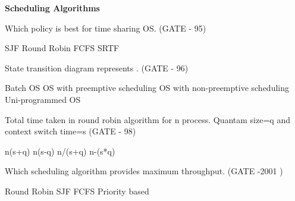 
\centerline{\textbf{ \LARGE Scheduling Algorithms}}


\setcounter{question}{0}


\begin{minipage}{\linewidth}

\question Which policy is best for time sharing OS. (GATE - 95)

\begin{oneparchoices}
   \choice SJF
   \choice Round Robin
   \choice FCFS
   \choice SRTF
\end{oneparchoices}

\end{minipage}


\begin{minipage}{\linewidth}


\question State transition diagram represents . (GATE - 96)
\begin{choices}
   \choice Batch OS
   \choice OS with preemptive scheduling
   \choice OS with non-preemptive scheduling
   \choice Uni-programmed OS
\end{choices}


\end{minipage}



\begin{minipage}{\linewidth}

\question Total time taken in round robin algorithm for n process. Quantam size=q and context switch time=s  (GATE - 98)


\begin{oneparchoices}
   \choice n(s+q)
   \choice n(s-q)
   \choice n/(s+q)
   \choice n-(s*q)
\end{oneparchoices}


\end{minipage}


\begin{minipage}{\linewidth}

  \question Which scheduling algorithm provides maximum throughput. (GATE -2001 )

  \begin{oneparchoices}
    \choice Round Robin
    \choice SJF
    \choice FCFS
    \choice Priority based
  \end{oneparchoices}

\end{minipage}

